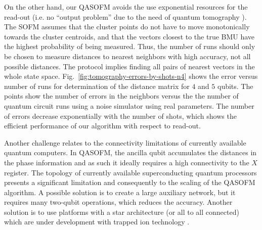 \documentclass[pra,showkeys,twocolumn,showpacs,aps,10pt]{revtex4-2}
\begin{document}
On the other hand, our QASOFM avoids the use exponential resources for the read-out  (i.e. no ``output problem'' due to the need of quantum tomography \cite{biamonte2017}).
The SOFM assumes that the cluster points do not have to move monotonically towards the cluster centroids,
and that the vectors closest to the true BMU have the highest probability of being measured.
Thus, the number of runs should only be chosen to measure distances to nearest neighbors with high accuracy, not all possible distances. The protocol implies finding all pairs of nearest vectors in the whole state space.
Fig.~\ref{fig:tomography-errors-by-shots-n4} shows the error versus number of runs for determination of the distance matrix for $4$  and $5$ qubits.
The points show the number of errors in the neighbors versus the the number of quantum circuit runs using a noise simulator using real parameters.  The number of errors decrease exponentially with the number of shots, which shows the efficient performance of our algorithm with respect to read-out.

Another challenge relates to the connectivity limitations of currently available quantum computers. In QASOFM, the ancilla qubit accumulates the distances in the phase information and as such it ideally requires a high connectivity to the $X $ register.  The topology of currently available superconducting quantum processors  presents a significant limitation and consequently to the scaling of the QASOFM algorithm.  A possible solution is to create a large auxiliary network,
but it requires many two-qubit operations, which reduces the accuracy.
Another solution is to use platforms with a star architecture (or all to all connected) which are under development with trapped ion technology \cite{QuantinuumsHSeriesHits}.
\end{document}
